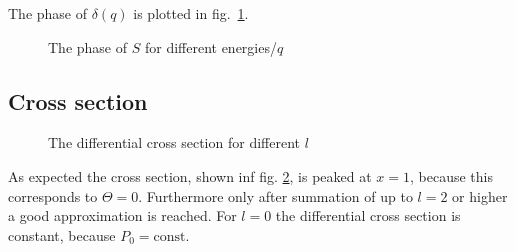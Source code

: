 \documentclass{scrartcl}
\begin{document}
The phase of $\delta(q)$ is plotted in fig.~\ref{fig:delta}.

\begin{figure}[htbp]
	
	\caption{The phase of $S$ for different energies/$q$}
	\label{fig:delta}
\end{figure}

\subsection{Cross section}

\begin{figure}[htbp]
	
	\caption{The differential cross section for different $l$}
	\label{fig:crossect}
\end{figure}
As expected the cross section, shown inf fig. \ref{fig:crossect}, is peaked at $x=1$, because this corresponds to $\Theta=0$. Furthermore only after summation of up to $l=2$ or higher a good approximation is reached. For $l=0$ the differential cross section is constant, because $P_0=\text{const}$.
\newpage
\listoffigures
\listoftables
\printbibliography
\end{document}
